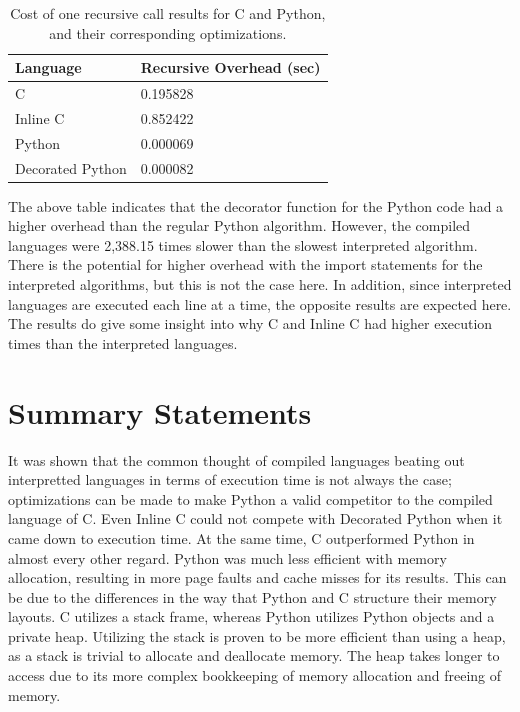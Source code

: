 \documentclass{sig-alternate}
\begin{document}
\begin{scriptsize}
\begin{table}[ht!]
  \centering
  \begin{tabular}{|l|l|}
    \hline
    \textbf{Language} & \textbf{Recursive Overhead (sec)}\\
    \hline
    C & 0.195828\\
    \hline
    Inline C & 0.852422\\
	\hline
	Python & 0.000069 \\
	\hline
	Decorated Python & 0.000082 \\
	\hline
\end{tabular}
\caption{Cost of one recursive call results for C and Python, and their corresponding optimizations.}
\label{table:formatting}
\end{table}
\end{scriptsize}

The above table indicates that the decorator function for the Python code had a higher overhead than the regular Python algorithm. However, the compiled languages were 2,388.15 times slower than the slowest interpreted algorithm. There is the potential for higher overhead with the import statements for the interpreted algorithms, but this is not the case here. In addition, since interpreted languages are executed each line at a time, the opposite results are expected here. The results do give some insight into why C and Inline C had higher execution times than the interpreted languages.

\section{Summary Statements}

It was shown that the common thought of compiled languages beating out interpretted languages in terms of execution time is not always the case; optimizations can be made to make Python a valid competitor to the compiled language of C. Even Inline C could not compete with Decorated Python when it came down to execution time. At the same time, C outperformed Python in almost every other regard. Python was much less efficient with memory allocation, resulting in more page faults and cache misses for its results. This can be due to the differences in the way that Python and C structure their memory layouts. C utilizes a stack frame, whereas Python utilizes Python objects and a private heap. Utilizing the stack is proven to be more efficient than using a heap, as a stack is trivial to allocate and deallocate memory. The heap takes longer to access due to its more complex bookkeeping of memory allocation and freeing of memory.
\end{document}
